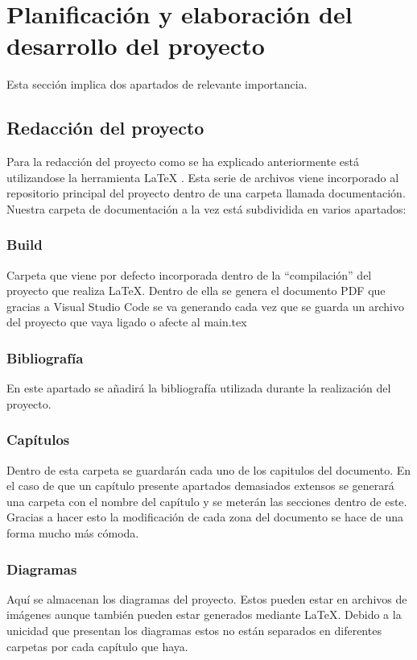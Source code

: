 \section{Planificación y elaboración del desarrollo del proyecto}

Esta sección implica dos apartados de relevante importancia.

\subsection{Redacción del proyecto}

Para la redacción del proyecto como se ha explicado anteriormente está utilizandose la herramienta LaTeX \cite{latex-book}. Esta serie de archivos viene incorporado al repositorio principal del proyecto dentro de una carpeta llamada documentación.
\\Nuestra carpeta de documentación a la vez está subdividida en varios apartados:

\subsubsection{Build}
Carpeta que viene por defecto incorporada dentro de la ``compilación'' del proyecto que realiza LaTeX. Dentro de ella se genera el documento PDF que gracias a Visual Studio Code se va generando cada vez que se guarda un archivo del proyecto que vaya ligado o afecte al main.tex

\subsubsection{Bibliografía}
En este apartado se añadirá la bibliografía utilizada durante la realización del proyecto.

\subsubsection{Capítulos}
Dentro de esta carpeta se guardarán cada uno de los capitulos del documento. En el caso de que un capítulo presente apartados demasiados extensos se generará una carpeta con el nombre del capítulo y se meterán las secciones dentro de este. Gracias a hacer esto la modificación de cada zona del documento se hace de una forma mucho más cómoda.

\subsubsection{Diagramas}
Aquí se almacenan los diagramas del proyecto. Estos pueden estar en archivos de imágenes aunque también pueden estar generados mediante LaTeX. Debido a la unicidad que presentan los diagramas estos no están separados en diferentes carpetas por cada capítulo que haya.

